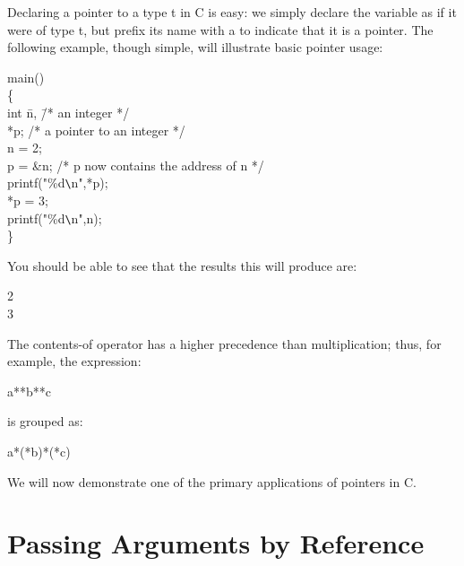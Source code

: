      Declaring a  pointer to  a type  {\ms t\/} in  C is  easy: we
simply declare the variable as  if it  were of  type {\ms t\/},  but
prefix its name with a {\cd *} to indicate that it is a pointer. The
following example, though simple, will illustrate basic pointer
usage:
\begin{code}
 main() \\
 \{ \+ \\
    int \=n, \tab \= /* an integer */ \\
	 \>    *p;\> /* a pointer to an integer */ \\
    n = 2; \\
    p = \&n; \>\> /* p now contains the address of n */ \\
    printf("\%d\verb+\+n",*p); \\
    {*}p = 3; \\
    printf("\%d\verb+\+n",n); \- \\
 \}
\end{code}
\noindent
     You should be able to see that the results this will produce are:
\begin{code}
2 \\
3
\end{code}
\noindent
     The {\ms contents-of\/}  operator has  a higher  precedence  than
multiplication; thus, for example, the expression:
\begin{code}
a**b**c
\end{code}
\noindent
 is grouped as:
\begin{code}
a*(*b)*(*c)
\end{code}
\noindent
     We will now demonstrate one of the primary applications of
pointers in C.



\section{Passing Arguments by Reference}

